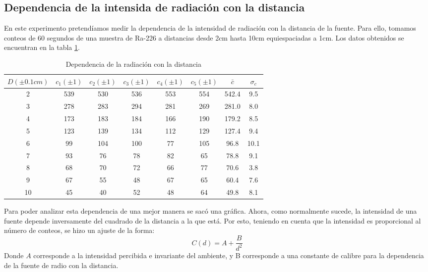 \documentclass[%
 reprint,
 amsmath,amssymb,
 aps,
]{revtex4-1}
\begin{document}
\subsection{\label{sec:level2}Dependencia de la intensida de radiación con la distancia}
En este experimento pretendíamos medir la dependencia de la intensidad de radiación con la distancia de la fuente. Para ello, tomamos conteos de 60 segundos de una muestra de Ra-226 a distancias desde 2cm hasta 10cm equiespaciadas a 1cm. Los datos obtenidos se encuentran en la tabla \ref{table:distancia}.\\


\begin{table}[h!]
\centering
\begin{tabular}{|c|c|c|c|c|c|c|c|}
	\hline $D(\pm0.1cm)$& $c_1(\pm1)$ & $c_2(\pm1)$ & $c_3(\pm1)$& $c_4(\pm1)$& $c_5(\pm1)$& $\bar{c}$ & $\sigma_c$\\
	\hline\hline
	2 & 539 & 530 & 536 & 553 & 554 & 542.4 & 9.5\\
	3 & 278 & 283 & 294 & 281 & 269 & 281.0 & 8.0\\
	4 & 173 & 183 & 184 & 166 & 190 & 179.2 & 8.5\\
	5 & 123 & 139 & 134 & 112 & 129 & 127.4 & 9.4\\
	6 & 99  & 104 & 100 & 77  & 105 & 96.8  & 10.1\\
	7 & 93  & 76  & 78  & 82  & 65  & 78.8  & 9.1\\
	8 & 68  & 70  & 72  & 66  & 77  & 70.6  & 3.8\\
	9 & 67  & 55  & 48  & 67  & 65  & 60.4  & 7.6\\
	10& 45  & 40  & 52  & 48  & 64  & 49.8  & 8.1\\
	[1ex] 
 \hline
 \end{tabular} 
  \caption{Dependencia de la radiación con la distancia}
\label{table:distancia} 
\end{table}

Para poder analizar esta dependencia de una mejor manera se sacó una gráfica. Ahora, como normalmente sucede, la intensidad de una fuente depende inversamente del cuadrado de la distancia a la que está. Por esto, teniendo en cuenta que la intensidad es proporcional al número de conteos, se hizo un ajuste de la forma:\\

\begin{equation}
 	C(d) = A + \frac{B}{d^2}
\end{equation}
Donde $A$ corresponde a la intensidad percibida e invariante del ambiente, y B corresponde a una constante de calibre  para la dependencia de la fuente de radio con la distancia.\\
\end{document}
